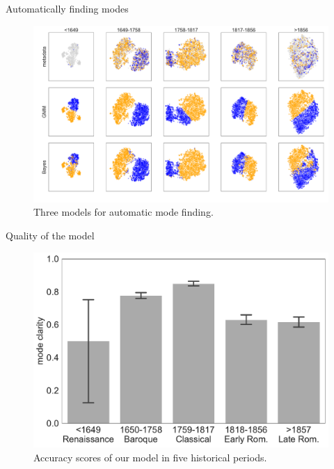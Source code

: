 \begin{frame}{Automatically finding modes}
    \begin{figure}
        \includegraphics[width=\linewidth,height=.8\textheight,keepaspectratio]{img/Figure4.pdf}
        \caption{Three models for automatic mode finding.}
    \end{figure}
\end{frame}

\begin{frame}{Quality of the model}
    \begin{figure}
        \includegraphics[width=\linewidth,height=.8\textheight,keepaspectratio]{img/Figure5.pdf}
        \caption{Accuracy scores of our model in five historical periods.}
    \end{figure}
\end{frame}

